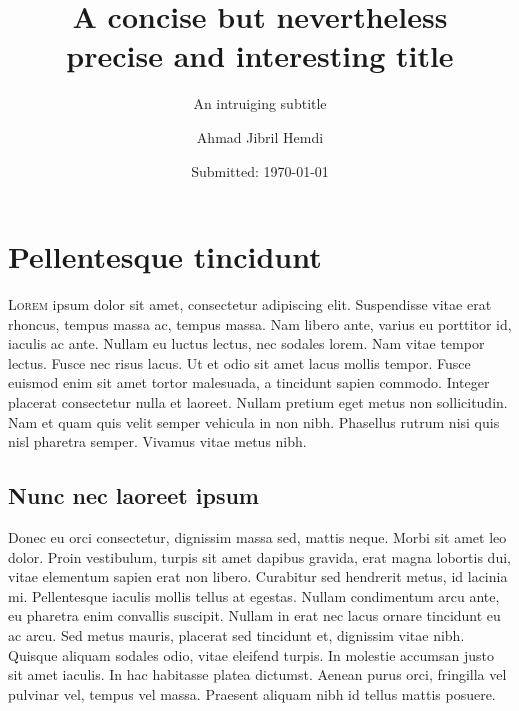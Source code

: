 \documentclass[11pt, a4paper]{memoir}
\author{Ahmad Jibril Hemdi}
\title{A concise but nevertheless\\precise and interesting title}
\subtitle{An intruiging subtitle}
\date{Submitted: \today}
\begin{document}
\begingroup
  \selectfont
  \maketitle
\endgroup

\tableofcontents

\section{Pellentesque tincidunt}
\lettrine{L}{orem} ipsum dolor sit amet, consectetur adipiscing elit. Suspendisse vitae erat rhoncus, tempus massa ac, tempus massa. Nam libero ante, varius eu porttitor id, iaculis ac ante. Nullam eu luctus lectus, nec sodales lorem. Nam vitae tempor lectus. Fusce nec risus lacus. Ut et odio sit amet lacus mollis tempor. Fusce euismod enim sit amet tortor malesuada, a tincidunt sapien commodo. Integer placerat consectetur nulla et laoreet. Nullam pretium eget metus non sollicitudin. Nam et quam quis velit semper vehicula in non nibh. Phasellus rutrum nisi quis nisl pharetra semper. Vivamus vitae metus nibh.

\subsection{Nunc nec laoreet ipsum}
Donec eu orci consectetur, dignissim massa sed, mattis neque. Morbi sit amet leo dolor. Proin vestibulum, turpis sit amet dapibus gravida, erat magna lobortis dui, vitae elementum sapien erat non libero. Curabitur sed hendrerit metus, id lacinia mi. Pellentesque iaculis mollis tellus at egestas. Nullam condimentum arcu ante, eu pharetra enim convallis suscipit. Nullam in erat nec lacus ornare tincidunt eu ac arcu. Sed metus mauris, placerat sed tincidunt et, dignissim vitae nibh. Quisque aliquam sodales odio, vitae eleifend turpis. In molestie accumsan justo sit amet iaculis. In hac habitasse platea dictumst. Aenean purus orci, fringilla vel pulvinar vel, tempus vel massa. Praesent aliquam nibh id tellus mattis posuere.
\end{document}
